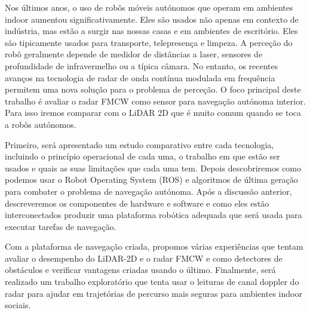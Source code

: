 \TitlePage
  \vspace*{55mm}
       {Nos últimos anos, o uso de robôs móveis autónomos que operam em ambientes indoor aumentou significativamente. Eles são usados não apenas
        em contexto de indústria, mas estão a surgir nas nossas casas e em ambientes de escritório. Eles são tipicamente usados para transporte, telepresença e limpeza. A perceção do robô geralmente depende de medidor de distâncias a laser, sensores de profundidade de infravermelho ou a típica câmara. No entanto, os recentes avanços na tecnologia de radar de onda contínua mo\-du\-la\-da em frequência permitem uma nova solução para o problema de perceção. 
       O foco principal deste trabalho é avaliar o \ac{radar} \ac{FMCW} como sensor para navegação autónoma interior. Para isso iremos comparar com o \ac{LiDAR} 2D que é muito comum quando se toca a robôs autónomos.
       }
       \TEXT{}
       { 
       Primeiro, será apresentado um estudo comparativo entre cada tecnologia, incluindo o princípio operacional de cada uma, o trabalho em que estão ser usados e quais as suas limitações que cada uma tem. Depois descobriremos como podemos usar o Robot Operating
        System (ROS) e algoritmos de última geração para combater o problema de navegação autónoma. Após a discussão anterior, descreveremos
        os componentes de hardware e software e como eles estão interconectados produzir uma plataforma robótica adequada que será usada para executar tarefas de navegação.
        
        }
       \TEXT{}     
       {Com a plataforma de navegação criada, propomos várias experiências que
        tentam avaliar o desempenho do LiDAR-2D e o radar FMCW e  como
        detectores de obstáculos e verificar vantagens criadas usando o
        último. Finalmente, será realizado um trabalho exploratório que tenta usar o leituras de canal doppler do radar para ajudar em trajetórias de percurso mais seguras para ambientes indoor sociais.
       }
 
